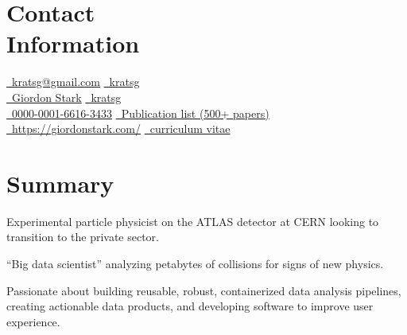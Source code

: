 \documentclass[margin,line]{resume}
\begin{document}
\begin{resume}

\section{\mysidestyle Contact\\Information}

\href{mailto:kratsg@gmail.com}{\faEnvelope~kratsg@gmail.com} \hfill \href{https://github.com/kratsg}{\faGithub~kratsg}
\vspace{0mm}\\\vspace{0mm}%
\href{https://www.linkedin.com/in/giordon-stark-5576b71b/}{\faLinkedin~Giordon Stark}  \hfill \href{https://twitter.com/kratsg}{\faTwitter~kratsg}
\vspace{0mm}\\\vspace{0mm}%
\href{https://orcid.org/0000-0001-6616-3433}{\aiOrcid~0000-0001-6616-3433} \hfill \href{https://inspirehep.net/literature?sort=mostrecent&size=25&page=1&q=a+g+ stark}{\aiADS~Publication list (500+ papers)}
\vspace{0mm}\\\vspace{0mm}%
\href{https://giordonstark.com/?utm_source=resume}{\faHome~https://giordonstark.com/} \hfill \href{https://kratsg.github.io/cv/cv_GiordonStark.pdf}{\faFileText~curriculum vitae}\\
\vspace{-6.5mm}%

\section{\mysidestyle Summary}
\begin{list2}
  \item Experimental particle physicist on the ATLAS detector at CERN looking to transition to the private sector.
  \item ``Big data scientist'' analyzing petabytes of collisions for signs of new physics.
  \item Passionate about building reusable, robust, containerized data analysis pipelines, creating actionable data products, and developing software to improve user experience.
\end{list2}


\end{resume}
\end{document}
